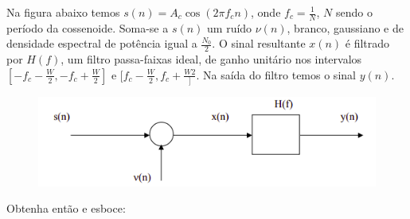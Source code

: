 \noindent
\begin{tcolorbox}[colframe=black,width =7cm,colback=gray!20,arc=0pt]
\end{tcolorbox}

Na figura abaixo temos $s(n) = A_c \cos(2 \pi f_c n)$, onde $f_c = \frac{1}{N}$, $N$ sendo o período da cossenoide.
Soma-se a $s(n)$ um ruído $\nu(n)$, branco, gaussiano e de densidade espectral de potência igual a $\frac{N_0}{2}$.
O sinal resultante $x(n)$ é filtrado por $H(f)$, um filtro passa-faixas ideal, de ganho unitário nos intervalos $[-f_c -\frac{W}{2}, -f_c + \frac{W}{2}]$ e $[f_c -\frac{W}{2}, f_c + \frac{W{2}}]$.
Na saída do filtro temos o sinal $y(n)$.

\begin{figure}[h!]
    \centering
    \includegraphics{../img/01/enunciado}
\end{figure}

Obtenha então e esboce:

